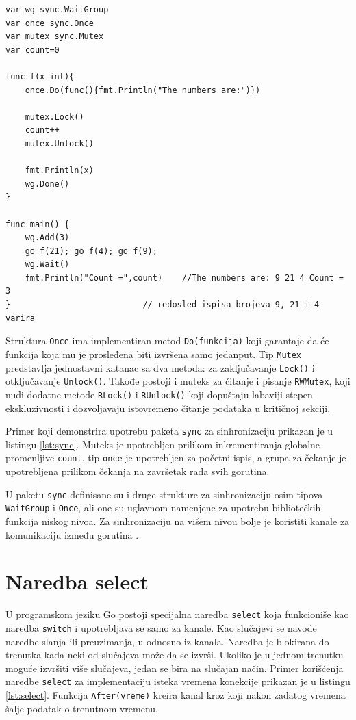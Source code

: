 \documentclass[12pt,oneside]{memoir}
\begin{document}
\begin{center}
\begin{lstlisting}[caption=Primer upotrebe paketa \texttt{sync} za sinhronizaciju, label={lst:sync},  backgroundcolor=\color{background}]
var wg sync.WaitGroup
var once sync.Once
var mutex sync.Mutex
var count=0

func f(x int){
	once.Do(func(){fmt.Println("The numbers are:")})
	
	mutex.Lock()
	count++
	mutex.Unlock()
	
	fmt.Println(x)
	wg.Done()
}

func main() {
	wg.Add(3)
	go f(21); go f(4); go f(9);	
	wg.Wait()
	fmt.Println("Count =",count)	//The numbers are: 9 21 4 Count = 3 
}							// redosled ispisa brojeva 9, 21 i 4 varira
\end{lstlisting}
\end{center}

Struktura \texttt{Once} ima implementiran metod \texttt{Do(funkcija)} koji garantaje da će funkcija koja mu je prosleđena biti izvršena samo jedanput. Tip  \texttt{Mutex} predstavlja jednostavni katanac sa dva metoda: za zaključavanje \texttt{Lock()} i otključavanje \texttt{Unlock()}. Takođe postoji i muteks za čitanje i pisanje \texttt{RWMutex}, koji nudi dodatne metode \texttt{RLock()} i \texttt{RUnlock()} koji dopuštaju labaviji stepen ekskluzivnosti i dozvoljavaju istovremeno čitanje podataka u kritičnoj sekciji.

Primer koji demonstrira upotrebu paketa \texttt{sync} za sinhronizaciju prikazan je u listingu \ref{lst:sync}. Muteks je upotrebljen prilikom inkrementiranja globalne promenljive \texttt{count}, tip \texttt{once} je upotrebljen za početni ispis, a grupa za čekanje je upotrebljena prilikom čekanja na završetak rada svih gorutina.

U paketu \texttt{sync} definisane su i druge strukture za sinhronizaciju osim tipova \texttt{WaitGroup}  i \texttt{Once}, ali one su uglavnom namenjene za upotrebu bibliotečkih funkcija niskog nivoa. Za sinhronizaciju na višem nivou bolje je koristiti kanale za komunikaciju između gorutina \cite{sync}. 

\section{Naredba select}

U programskom jeziku Go postoji specijalna naredba \texttt{select} koja funkcioniše kao naredba \texttt{switch} i upotrebljava se samo za kanale. Kao slučajevi se navode naredbe slanja ili preuzimanja, u odnosno iz kanala. Naredba je blokirana do trenutka kada neki od slučajeva može da se izvrši. Ukoliko je u jednom trenutku moguće izvršiti  više slučajeva, jedan se bira na slučajan način. Primer korišćenja naredbe \texttt{select} za implementaciju isteka vremena konekcije prikazan je u listingu \ref{lst:select}. Funkcija \texttt{After(vreme)} kreira kanal kroz koji nakon zadatog vremena šalje podatak o trenutnom vremenu.
\end{document}

